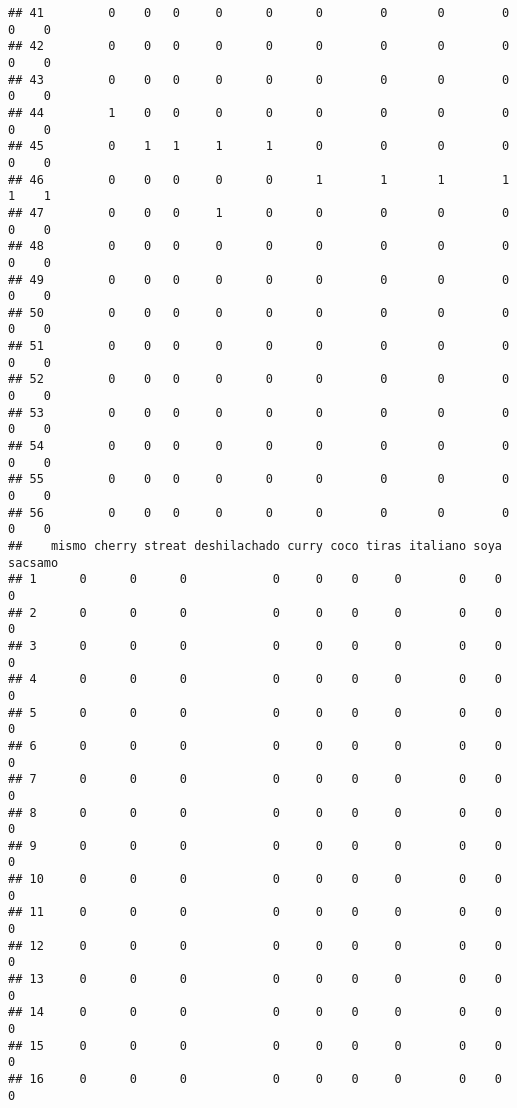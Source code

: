\documentclass[
]{article}
\begin{document}
\begin{verbatim}
## 41         0    0   0     0      0      0        0       0        0     0    0
## 42         0    0   0     0      0      0        0       0        0     0    0
## 43         0    0   0     0      0      0        0       0        0     0    0
## 44         1    0   0     0      0      0        0       0        0     0    0
## 45         0    1   1     1      1      0        0       0        0     0    0
## 46         0    0   0     0      0      1        1       1        1     1    1
## 47         0    0   0     1      0      0        0       0        0     0    0
## 48         0    0   0     0      0      0        0       0        0     0    0
## 49         0    0   0     0      0      0        0       0        0     0    0
## 50         0    0   0     0      0      0        0       0        0     0    0
## 51         0    0   0     0      0      0        0       0        0     0    0
## 52         0    0   0     0      0      0        0       0        0     0    0
## 53         0    0   0     0      0      0        0       0        0     0    0
## 54         0    0   0     0      0      0        0       0        0     0    0
## 55         0    0   0     0      0      0        0       0        0     0    0
## 56         0    0   0     0      0      0        0       0        0     0    0
##    mismo cherry streat deshilachado curry coco tiras italiano soya sacsamo
## 1      0      0      0            0     0    0     0        0    0       0
## 2      0      0      0            0     0    0     0        0    0       0
## 3      0      0      0            0     0    0     0        0    0       0
## 4      0      0      0            0     0    0     0        0    0       0
## 5      0      0      0            0     0    0     0        0    0       0
## 6      0      0      0            0     0    0     0        0    0       0
## 7      0      0      0            0     0    0     0        0    0       0
## 8      0      0      0            0     0    0     0        0    0       0
## 9      0      0      0            0     0    0     0        0    0       0
## 10     0      0      0            0     0    0     0        0    0       0
## 11     0      0      0            0     0    0     0        0    0       0
## 12     0      0      0            0     0    0     0        0    0       0
## 13     0      0      0            0     0    0     0        0    0       0
## 14     0      0      0            0     0    0     0        0    0       0
## 15     0      0      0            0     0    0     0        0    0       0
## 16     0      0      0            0     0    0     0        0    0       0

\end{verbatim}
\end{document}
